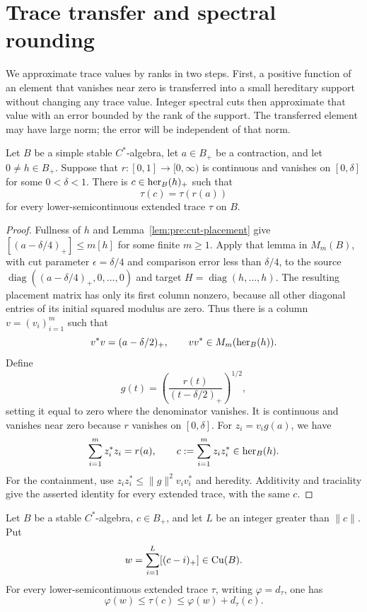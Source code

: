 \section{Trace transfer and spectral rounding}
\label{ext:sec:rounding}

We approximate trace values by ranks in two steps. First, a positive
function of an element that vanishes near zero is transferred into a
small hereditary support without changing any trace value. Integer
spectral cuts then approximate that value with an error bounded by the
rank of the support. The transferred element may have large norm; the
error will be independent of that norm.

\begin{lemma}
\label{ext:lem:transfer}
Let $B$ be a simple stable $C^*$-algebra, let $a\in B_+$ be a
contraction, and let $0\ne h\in B_+$. Suppose that
$r:[0,1]\to[0,\infty)$ is continuous and vanishes on $[0,\delta]$
for some $0<\delta<1$. There is $c\in\operatorname{her}_B(h)_+$ such that
\[
 \tau(c)=\tau(r(a))
\]
for every lower-semicontinuous extended trace $\tau$ on $B$.
\end{lemma}

\begin{proof}
Fullness of $h$ and Lemma~\ref{lem:pre:cut-placement} give
$[(a-\delta/4)_+]\le m[h]$ for some finite $m\ge1$.
Apply that lemma in $M_m(B)$, with cut parameter
$\epsilon=\delta/4$ and comparison error less than $\delta/4$,
to the source $\operatorname{diag}((a-\delta/4)_+,0,\ldots,0)$
and target $H=\operatorname{diag}(h,\ldots,h)$.
The resulting placement matrix has only its first column nonzero,
because all other diagonal entries of its initial squared modulus
are zero. Thus there is a column $v=(v_i)_{i=1}^m$ such that
\[
 v^*v=(a-\delta/2)_+,\qquad
 vv^*\in M_m(\operatorname{her}_B(h)).
\]
Define
\[
 g(t)=\left(\frac{r(t)}{(t-\delta/2)_+}\right)^{1/2},
\]
setting it equal to zero where the denominator vanishes.
It is continuous and vanishes near zero because $r$ vanishes on
$[0,\delta]$. For $z_i=v_i g(a)$, we have
\[
 \sum_{i=1}^m z_i^*z_i=r(a),\qquad
 c:=\sum_{i=1}^m z_i z_i^*\in\operatorname{her}_B(h).
\]
For the containment, use
$z_i z_i^*\le\|g\|^2v_i v_i^*$ and heredity.
Additivity and traciality give the asserted identity for every
extended trace, with the same $c$.
\end{proof}

\begin{lemma}
\label{ext:lem:rounding}
Let $B$ be a stable $C^*$-algebra, $c\in B_+$, and let $L$ be an
integer greater than $\|c\|$. Put
\[
 w=\sum_{i=1}^L[(c-i)_+]\in\mathrm{Cu}(B).
\]
For every lower-semicontinuous extended trace $\tau$, writing
$\varphi=d_\tau$, one has
\begin{equation}
\label{ext:eq:rounding}
 \varphi(w)\le\tau(c)\le\varphi(w)+d_\tau(c).
\end{equation}
\end{lemma}

